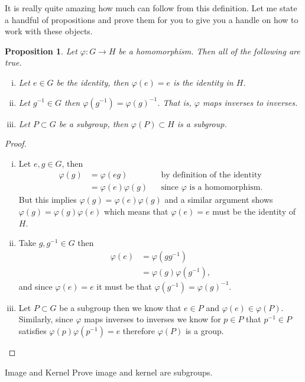 \documentclass{article}
\theoremstyle{indented}
\newtheorem{proposition}{Proposition}
\begin{document}
It is really quite amazing how much can follow from this definition. Let me state a handful of propositions and prove them for you to give you a handle on how to work with these objects.

\begin{proposition}
Let $\varphi \colon G \to H$ be a homomorphism. Then all of the following are true.
\begin{enumerate}[i.]
    \item Let $e\in G$ be the identity, then $\varphi(e)=e$ is the identity in $H$.
    \item Let $g^{-1}\in G$ then $\varphi(g^{-1})=\varphi(g)^{-1}$. That is, $\varphi$ maps inverses to inverses.
    \item Let $P\subset G$ be a subgroup, then $\varphi(P) \subset H$ is a subgroup.
\end{enumerate}
\end{proposition}
\begin{proof}~
\begin{enumerate}[i.]
    \item Let $e,g \in G$, then
    \begin{align*}
    \varphi(g)&=\varphi(eg) && \textrm{by definition of the identity}\\
    &= \varphi(e)\varphi(g) &&\textrm{since $\varphi$ is a homomorphism}.
    \end{align*}
    But this implies $\varphi(g)=\varphi(e)\varphi(g)$ and a similar argument shows $\varphi(g)=\varphi(g)\varphi(e)$ which means that $\varphi(e)=e$ must be the identity of $H$.
    \item Take $g,g^{-1} \in G$ then
    \begin{align*}
    \varphi(e) &= \varphi(gg^{-1})\\
    &= \varphi(g)\varphi(g^{-1}),
    \end{align*}
    and since $\varphi(e)=e$ it must be that $\varphi(g^{-1})=\varphi(g)^{-1}$.
    \item Let $P\subset G$ be a subgroup then we know that $e\in P$ and $\varphi(e) \in \varphi(P)$. Similarly, since $\varphi$ maps inverses to inverses we know for $p\in P$ that $p^{-1} \in P$ satisfies $\varphi(p)\varphi(p^{-1})=e$ therefore $\varphi(P)$ is a group.
\end{enumerate}
\end{proof}

\begin{problem}{Image and Kernel}{}
Prove image and kernel are subgroups.
\end{problem}
\end{document}
